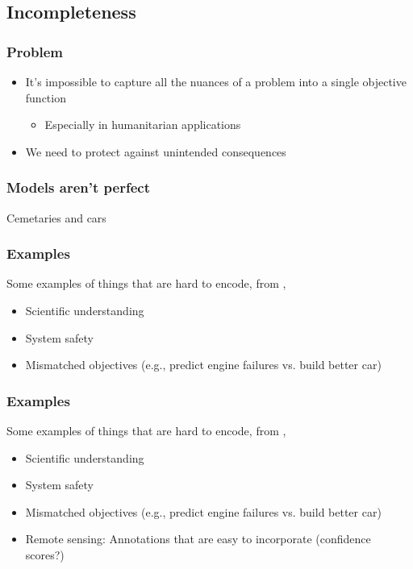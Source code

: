 \documentclass[10pt,mathserif]{beamer}
\begin{document}
\subsection{Incompleteness}
\label{subsec:label}

\begin{frame}
  \frametitle{Problem}
  \begin{itemize}
  \item It's impossible to capture all the nuances of a problem into a single
    objective function
    \begin{itemize}
    \item Especially in humanitarian applications
    \end{itemize}
  \item We need to protect against unintended consequences
  \end{itemize}
\end{frame}

\begin{frame}
  \frametitle{Models aren't perfect}
 Cemetaries and cars 
\end{frame}

\begin{frame}
  \frametitle{Examples}
  Some examples of things that are hard to encode, from
  \citep{doshi2017towards},
  \begin{itemize}
  \item Scientific understanding
  \item System safety
  \item Mismatched objectives (e.g., predict engine failures vs. build better
    car)
  \end{itemize}
\end{frame}

\begin{frame}
  \frametitle{Examples}
  Some examples of things that are hard to encode, from
  \citep{doshi2017towards},
  \begin{itemize}
  \item Scientific understanding
  \item System safety
  \item Mismatched objectives (e.g., predict engine failures vs. build better
    car)
  \item Remote sensing: Annotations that are easy to incorporate (confidence
    scores?)
  \end{itemize}
\end{frame}
\end{document}
